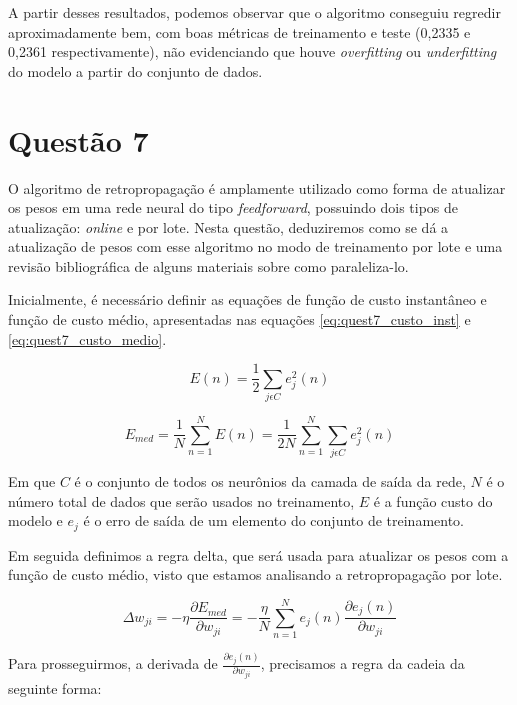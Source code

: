 \documentclass[a4paper, 12pt]{article}
\begin{document}
A partir desses resultados, podemos observar que o algoritmo conseguiu regredir aproximadamente bem, com boas métricas de treinamento e teste (0,2335 e 0,2361 respectivamente), não evidenciando que houve \textit{overfitting} ou \textit{underfitting} do modelo a partir do conjunto de dados.

\section{Questão 7}

O algoritmo de retropropagação é amplamente utilizado como forma de atualizar os pesos em uma rede neural do tipo \textit{feedforward}, possuindo dois tipos de atualização: \textit{online} e por lote. Nesta questão, deduziremos como se dá a atualização de pesos com esse algoritmo no modo de treinamento por lote e uma revisão bibliográfica de alguns materiais sobre como paraleliza-lo.

Inicialmente, é necessário definir as equações de função de custo instantâneo e função de custo médio, apresentadas nas equações \ref{eq:quest7_custo_inst} e \ref{eq:quest7_custo_medio}.

\begin{equation}\label{eq:quest7_custo_inst}
    E(n) = \frac{1}{2} \sum\limits_{j\epsilon C} e^2_j(n)
\end{equation}

\begin{equation}
    E_{med} = \frac{1}{N} \sum\limits_{n=1}^{N} E(n) =  \frac{1}{2N}\sum\limits_{n=1}^{N}\sum\limits_{j\epsilon C} e^2_j(n)
\end{equation}

Em que $C$ é o conjunto de todos os neurônios da camada de saída da rede, $N$ é o número total de dados que serão usados no treinamento, $E$ é a função custo do modelo e $e_j$ é o erro de saída de um elemento do conjunto de treinamento.

Em seguida definimos a regra delta, que será usada para atualizar os pesos com a função de custo médio, visto que estamos analisando a retropropagação por lote.

\begin{equation}\label{eq:quest7_regradelta}
    \Delta w_{ji} = -\eta \frac{\partial E_{med}}{\partial w_{ji}}
    =-\frac{\eta}{N} \sum\limits_{n=1}^{N} e_j(n) \frac{\partial e_j(n)}{\partial w_{ji}}
\end{equation}

Para prosseguirmos, a derivada de $\frac{\partial e_j(n)}{\partial w_{ji}}$, precisamos a regra da cadeia da seguinte forma:
\end{document}

